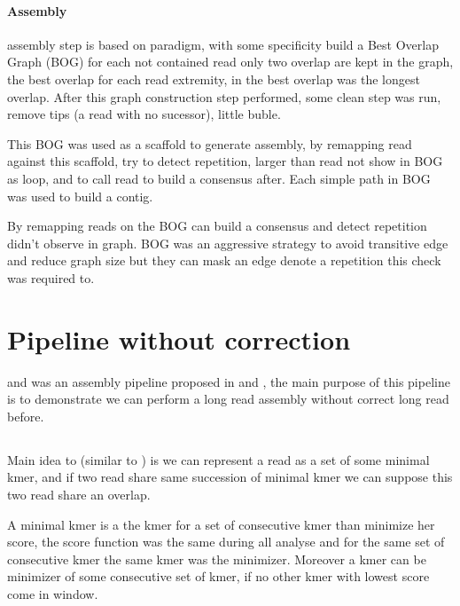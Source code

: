 \documentclass[main]{subfiles}
\begin{document}
\paragraph{Assembly}

\canu assembly step is based on \OLC paradigm, with some specificity \canu build a Best Overlap Graph (BOG) for each not contained read only two overlap are kept in the graph, the best overlap for each read extremity, in \canu the best overlap was the longest overlap. After this graph construction step performed, some clean step was run, remove tips (a read with no sucessor), little buble.

This BOG was used as a scaffold to generate assembly, by remapping read against this scaffold, \canu try to detect repetition, larger than read not show in BOG as loop, and to call read to build a consensus after. Each simple path in BOG was used to build a contig. 

By remapping reads on the BOG \canu can build a consensus and detect repetition didn't observe in graph. BOG was an aggressive strategy to avoid transitive edge and reduce graph size but they can mask an edge denote a repetition this check was required to.


\section{Pipeline without correction \miniasm} \label{section:sota:miniasm}

\minimap and \miniasm was an assembly pipeline proposed in \cite{miniasm_minimap} and \cite{minimap2}, the main purpose of this pipeline is to demonstrate we can perform a long read assembly without correct long read before.

\subsection{\minimap}

Main idea to \minimap (similar to \mhap) is we can represent a read as a set of some minimal kmer, and if two read share same succession of minimal kmer we can suppose this two read share an overlap.

A minimal kmer is a the kmer for a set of consecutive kmer than minimize her score, the score function was the same during all analyse and for the same set of consecutive kmer the same kmer was the minimizer. Moreover a kmer can be minimizer of some consecutive set of kmer, if no other kmer with lowest score come in window. 
\end{document}
